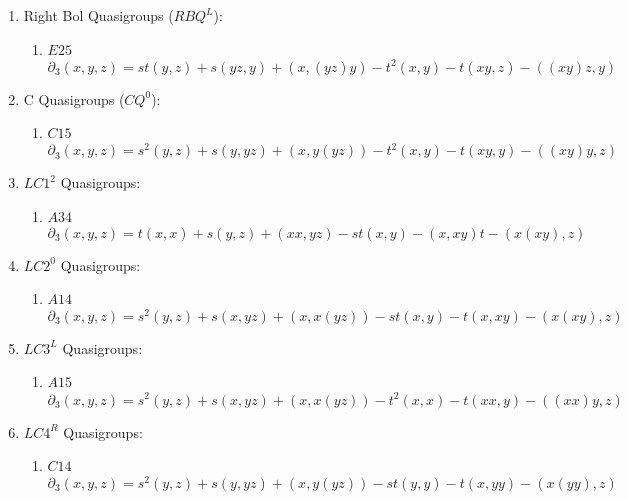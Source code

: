 \documentclass[11pt]{amsart}
\theoremstyle{definition}
\begin{document}
\begin{enumerate}
    \item[(11)] Right Bol Quasigroups ($RBQ^L$):

    \begin{enumerate}
        \item $E25$
        \[ \partial_3(x,y,z)= st (y, z) + s (y z, y) + (x, (y z) y) - t^2 (x, y)   -  t (x y, z)    - ((x y) z, y) \]
    \end{enumerate}

\item[(12)] C Quasigroups ($CQ^0$):

    \begin{enumerate}
        \item $C15$
        \[ \partial_3(x,y,z)=s^2 (y, z)  + s (y, y z) + (x, y (y z)) - t^2 (x, y)  -   t (x y, y)    - ((x y) y, z)  \]
    \end{enumerate}

\item[(13)] $LC1^2$ Quasigroups:

    \begin{enumerate}
        \item $A34$
        \[ \partial_3(x,y,z)= t(x, x) + s(y, z) + (x x, y z) - st(x, y) - 
 (x, x y) t   -(x (x y), z)    \]
    \end{enumerate}

\item[(14)] $LC2^0$ Quasigroups:

    \begin{enumerate}
        \item $A14$
        \[ \partial_3(x,y,z)=s^2  (y, z) + s(x, y z) + (x, x (y z)) - st (x, y)  -
  t (x, x y)  - (x (x y), z)   \]
    \end{enumerate}

\item[(15)] $LC3^L$ Quasigroups:

    \begin{enumerate}
        \item $A15$
        \[ \partial_3(x,y,z)= s^2 (y, z)  + s (x, y z) + (x, x (y z)) - t^2 (x, x)  -
  t (x x, y)  - ((x x) y, z)   \]
    \end{enumerate}

\item[(16)] $LC4^R$ Quasigroups:

    \begin{enumerate}
        \item $C14$
        \[ \partial_3(x,y,z)= s^2 (y, z) + s (y, y z) + (x, y (y z)) - st (y, y)- t (x, y y)  - (x (y y), z)     \]
    \end{enumerate}


\end{enumerate}
\end{document}
